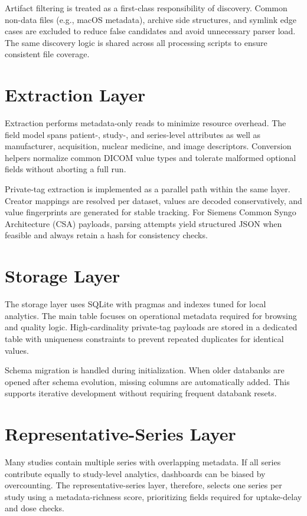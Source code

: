 Artifact filtering is treated as a first-class responsibility of discovery. Common non-data files (e.g., macOS metadata), archive side structures, and symlink edge cases are excluded to reduce false candidates and avoid unnecessary parser load. The same discovery logic is shared across all processing scripts to ensure consistent file coverage.

\section{Extraction Layer}
Extraction performs metadata-only reads to minimize resource overhead. The field model spans patient-, study-, and series-level attributes as well as manufacturer, acquisition, nuclear medicine, and image descriptors. Conversion helpers normalize common DICOM value types and tolerate malformed optional fields without aborting a full run.

Private-tag extraction is implemented as a parallel path within the same layer. Creator mappings are resolved per dataset, values are decoded conservatively, and value fingerprints are generated for stable tracking. For Siemens Common Syngo Architecture (CSA) payloads, parsing attempts yield structured JSON when feasible and always retain a hash for consistency checks.

\section{Storage Layer}
The storage layer uses SQLite with pragmas and indexes tuned for local analytics. The main table focuses on operational metadata required for browsing and quality logic. High-cardinality private-tag payloads are stored in a dedicated table with uniqueness constraints to prevent repeated duplicates for identical values.

Schema migration is handled during initialization. When older databanks are opened after schema evolution, missing columns are automatically added. This supports iterative development without requiring frequent databank resets.


\section{Representative-Series Layer}
Many studies contain multiple series with overlapping metadata. If all series contribute equally to study-level analytics, dashboards can be biased by overcounting. The representative-series layer, therefore, selects one series per study using a metadata-richness score, prioritizing fields required for uptake-delay and dose checks.


